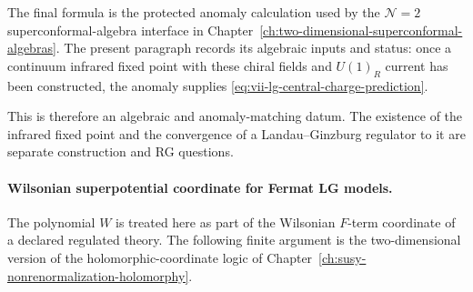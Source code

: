 The final formula is the protected anomaly calculation used by the
\(\mathcal N=2\) superconformal-algebra interface in
Chapter~\ref{ch:two-dimensional-superconformal-algebras}.  The present
paragraph records its algebraic inputs and status: once a continuum
infrared fixed point with these chiral fields and \(U(1)_R\) current has
been constructed, the anomaly supplies \eqref{eq:vii-lg-central-charge-prediction}.

This is therefore an algebraic and anomaly-matching datum.  The existence of
the infrared fixed point and the convergence of a Landau--Ginzburg regulator
to it are separate construction and RG questions.

\paragraph{Wilsonian superpotential coordinate for Fermat LG models.}
The polynomial \(W\) is treated here as part of the Wilsonian \(F\)-term
coordinate of a declared regulated theory.  The following
finite argument is the two-dimensional version of the holomorphic-coordinate
logic of Chapter~\ref{ch:susy-nonrenormalization-holomorphy}.

